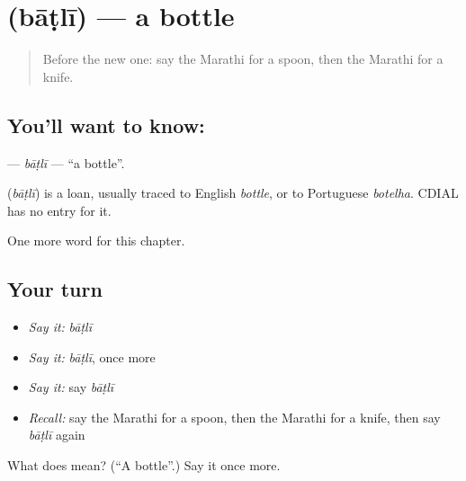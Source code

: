 \section[\texorpdfstring{\mr{बाटली} (bāṭlī)}{बाटली (bāṭlī)}]{ (bāṭlī) — a bottle}

\label{lesson:MR-C92-batli}



\begin{quote}
Before the new one: say the Marathi for a spoon, then the Marathi for a knife.
\end{quote}

\subsection*{You'll want to know: }
\textbf{} — \emph{bāṭlī} — \textquotedblleft{}a bottle\textquotedblright{}.

\begin{cousinweb}
\textbf{} (\emph{bāṭlī}) is a loan, usually traced to English \emph{bottle}, or to Portuguese \emph{botelha}. CDIAL has no entry for it.
\end{cousinweb}

\begin{grammarlens}[title={What you've built}]
One more word for this chapter.
\end{grammarlens}

\subsection*{Your turn}
\begin{itemize}
\raggedright
  \item \emph{Say it:} \emph{bāṭlī}
  \item \emph{Say it:} \emph{bāṭlī}, once more
  \item \emph{Say it:} say \emph{bāṭlī}
  \item \emph{Recall:} say the Marathi for a spoon, then the Marathi for a knife, then say \emph{bāṭlī} again
\end{itemize}

\begin{tcolorbox}[breakable,colback=teal!4,colframe=teal!35!black,title={Before you move on}]
What does  mean? (\textquotedblleft{}A bottle\textquotedblright{}.) Say it once more.
\end{tcolorbox}
